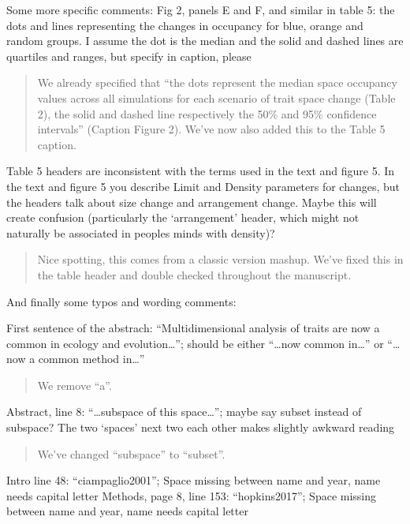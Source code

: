 \documentclass[]{article}
\begin{document}
Some more specific comments: Fig 2, panels E and F, and similar in table
5: the dots and lines representing the changes in occupancy for blue,
orange and random groups. I assume the dot is the median and the solid
and dashed lines are quartiles and ranges, but specify in caption,
please

\begin{quote}
We already specified that ``the dots represent the median space
occupancy values across all simulations for each scenario of trait space
change (Table 2), the solid and dashed line respectively the 50\% and
95\% confidence intervals'' (Caption Figure 2). We've now also added
this to the Table 5 caption.
\end{quote}

Table 5 headers are inconsistent with the terms used in the text and
figure 5. In the text and figure 5 you describe Limit and Density
parameters for changes, but the headers talk about size change and
arrangement change. Maybe this will create confusion (particularly the
`arrangement' header, which might not naturally be associated in peoples
minds with density)?

\begin{quote}
Nice spotting, this comes from a classic version mashup. We've fixed
this in the table header and double checked throughout the manuscript.
\end{quote}

And finally some typos and wording comments:

First sentence of the abstrach: ``Multidimensional analysis of traits
are now a common in ecology and evolution\ldots{}''; should be either
``\ldots{}now common in\ldots{}'' or ``\ldots{}now a common method
in\ldots{}''

\begin{quote}
We remove ``a''.
\end{quote}

Abstract, line 8: ``\ldots{}subspace of this space\ldots{}''; maybe say
subset instead of subspace? The two `spaces' next two each other makes
slightly awkward reading

\begin{quote}
We've changed ``subspace'' to ``subset''.
\end{quote}

Intro line 48: ``ciampaglio2001''; Space missing between name and year,
name needs capital letter Methods, page 8, line 153: ``hopkins2017'';
Space missing between name and year, name needs capital letter
\end{document}
